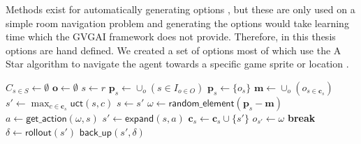 Methods exist for automatically generating options \cite{castro2012automatic},
but these are only used on a simple room navigation problem and generating the
options would take learning time which the GVGAI framework does not provide.
Therefore, in this thesis options are hand defined. We created a set of options
most of which use the A Star algorithm to navigate the agent towards a specific
game sprite or location \cite{hart1968formal}.

\begin{algorithm}[h]
	\caption{$\mathsf{O-MCTS}(O, r, t, d)$}
	\label{alg:omcts}
	\begin{algorithmic}[1]
		\State $C_{s \in S} \gets \emptyset$ 
		\State $\mathbf{o} \gets \emptyset$ 
		 \label{alg:omcts:mainloop}
			\State $s \gets r$ 
			 \label{alg:omcts:innerloop}
				 \label{alg:omcts:sp} 
					\State $\mathbf{p}_s \gets \cup_o (s \in I_{o \in O})$ 
				\Else
					\State $\mathbf{p}_s \gets \{o_s\}$ 
				\EndIf \label{alg:omcts:ep}
				\State $\mathbf{m} \gets \cup_o (o_{s \in \mathbf{c}_s})$ 
				 
					\State $s' \gets \max_{c \in \mathbf{c}_s} \mathsf{uct}(s, c)$ \label{alg:omcts:uct} 
					\State $s \gets s'$ \label{alg:omcts:ss} 
				\Else \label{alg:omcts:sexpand}
					\State $\omega \gets \mathsf{random\_element}(\mathbf{p}_s - \mathbf{m})$ 
					\State $a \gets \mathsf{get\_action}(\omega, s)$ 
					\State $s' \gets \mathsf{expand}(s, a)$ 
						\State $\mathbf{c}_s \gets \mathbf{c}_s \cup \{s'\}$ 
					\State $o_{s'} \gets \omega$
					\State \textbf{break} \label{alg:omcts:break}
				\EndIf \label{alg:omcts:eexpand}
			\EndWhile
			\State $\delta \gets \mathsf{rollout}(s')$ \label{alg:omcts:rollout}
			\State $\mathsf{back\_up}(s', \delta)$ \label{alg:omcts:backup}
		\EndWhile
		\State {}
	\end{algorithmic}
\end{algorithm}


